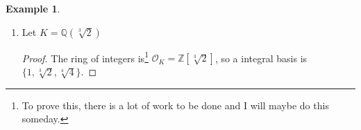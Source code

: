\documentclass[a4paper]{book}
\theoremstyle{definition}
\newtheorem{example}{Example}[definition]
\newcommand{\set}[1]{\left\{\, #1 \,\right\}}
\begin{document}
\begin{example}
\begin{enumerate}
\begin{proof}
\begin{enumerate}
\begin{align*}
\begin{pmatrix}
                        \frac{1 + \sqrt{d}}{2} & \frac{1 - \sqrt{d}}{2}
                    \end{pmatrix}^2
                    = \left(\frac{1 - \sqrt{d}}{2} - \frac{1 + \sqrt{d}}{2}\right)^2
                    = \left(-\frac{2 \sqrt{d}}{2}\right)^2 = d \text{.}
                \end{align*}
                \item On the other hand, if \(\alpha = \sqrt{d}\), then a integral basis and its conjugate are
                \begin{align*}
                    \set{1, \sqrt{d}} \text{ and } \set{1, -\sqrt{d}}
                \end{align*}
                and hence we have
                \begin{align*}
                    \Delta_K = \begin{pmatrix}
                        1 & 1 \\
                        \sqrt{d} & -\sqrt{d}
                    \end{pmatrix}^2
                    = \left(-2\sqrt{d}\right)^2 = 4d \text{.}
                \end{align*}
            \end{enumerate}
            Conclude the stated result above.
        \end{proof}
    \item Let \(K = \mathbb{Q}(\sqrt[3]{2})\)
    \begin{proof}
        The ring of integers is\footnote{To prove this, there is a lot of work to be done and I will maybe do this someday.} \(\mathcal{O}_K = \mathbb{Z}[\sqrt[3]{2}]\), so a integral basis is \(\{1, \sqrt[3]{2}, \sqrt[4]{4}\}\).
    \end{proof}
    \end{enumerate}
\end{example}
\end{document}
